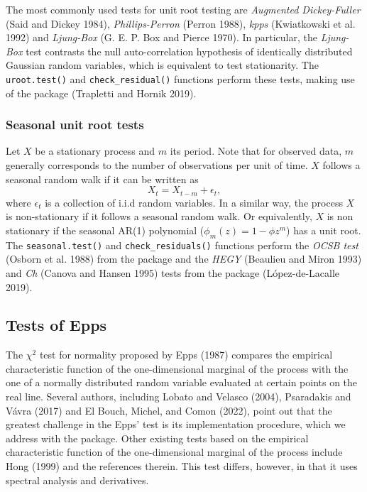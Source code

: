 The most commonly used tests for unit root testing are \emph{Augmented Dickey-Fuller} (Said and Dickey 1984), \emph{Phillips-Perron} (Perron 1988), \emph{kpps} (Kwiatkowski et al. 1992) and \textit{Ljung-Box} (G. E. P. Box and Pierce 1970). In particular, the \emph{Ljung-Box} test contrasts the null auto-correlation hypothesis of identically distributed Gaussian random variables, which is equivalent to test stationarity. The \texttt{uroot.test()} and \texttt{check\_residual()} functions perform these tests, making use of the  package (Trapletti and Hornik 2019).

\hypertarget{seasonal-unit-root-tests}{%
\subsubsection{Seasonal unit root tests}\label{seasonal-unit-root-tests}}

Let \(X\) be a stationary process and \(m\) its period. Note that for observed data, \(m\) generally corresponds to the number of observations per unit of time. \(X\) follows a seasonal random walk if it can be written as
\[
 X_t = X_{t-m} + \epsilon_t,
\]
where \(\epsilon_t\) is a collection of i.i.d random variables. In a similar way, the process \(X\) is non-stationary if it follows a seasonal random walk. Or equivalently, \(X\) is non stationary if the seasonal AR(1) polynomial (\(\phi_m(z) = 1 - \phi z^m\)) has a unit root. The \texttt{seasonal.test()} and \texttt{check\_residuals()} functions perform the \emph{OCSB test} (Osborn et al. 1988) from the  package and the \emph{HEGY} (Beaulieu and Miron 1993) and \emph{Ch} (Canova and Hansen 1995) tests from the  package (López-de-Lacalle 2019).

\hypertarget{tests-of-epps}{%
\subsection{Tests of Epps}\label{tests-of-epps}}

The \(\chi^2\) test for normality proposed by Epps (1987) compares the empirical characteristic function of the one-dimensional marginal of the process with the one of a normally distributed random variable evaluated at certain points on the real line. Several authors, including Lobato and Velasco (2004), Psaradakis and Vávra (2017) and El Bouch, Michel, and Comon (2022), point out that the greatest challenge in the Epps' test is its implementation procedure, which we address with the  package. Other existing tests based on the empirical characteristic function of the one-dimensional marginal of the process include Hong (1999) and the references therein. This test differs, however, in that it uses spectral analysis and derivatives.

